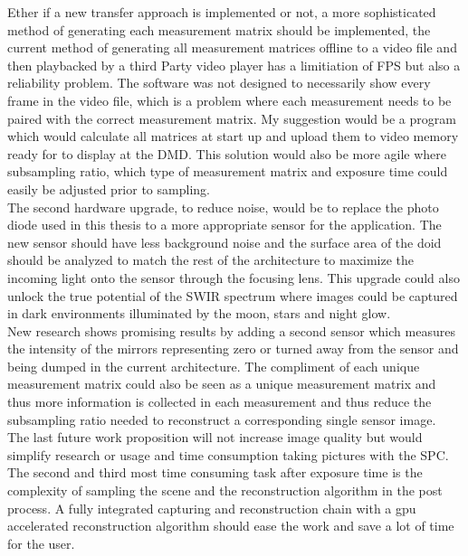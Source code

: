 Ether if a new transfer approach is implemented or not, a more sophisticated method of generating each measurement matrix should be implemented, the current method of generating all  measurement matrices offline to a video file and then playbacked by a third Party video player has a limitiation of FPS but also a reliability problem. The software was not designed to necessarily show every frame in the video file, which is a problem where each measurement needs to be paired with the correct measurement matrix. My suggestion would be a program which would calculate all matrices at start up and upload them to video memory ready for to display at the DMD. This solution would also be more agile where subsampling ratio, which type of measurement matrix and exposure time could easily be adjusted prior to sampling.\\[0.1in]

The second hardware upgrade, to reduce noise, would be to replace the photo diode used in this thesis to a more appropriate sensor for the application. The new sensor should have less background noise and the surface area of the doid should be analyzed to match the rest of the architecture to maximize the incoming light onto the sensor through the focusing lens. This upgrade could also unlock the true potential of the SWIR spectrum where images could be captured in dark environments illuminated by the moon, stars and night glow.\\[0.1in]

New research shows promising results by adding a second sensor which measures the intensity of the mirrors representing zero or turned away from the sensor and being dumped in the current architecture. The compliment of each unique measurement matrix could also be seen as a unique measurement matrix and thus more information is collected in each measurement and thus reduce the subsampling ratio needed to reconstruct a corresponding single sensor image.\\[0.1in]

The last future work proposition will not increase image quality but would simplify research or usage and time consumption taking pictures with the SPC. The second and third most time consuming task after exposure time is the complexity of sampling the scene and the reconstruction algorithm in the post process. A fully integrated capturing and reconstruction chain with a gpu accelerated reconstruction algorithm should ease the work and save a lot of time for the user. 
 
